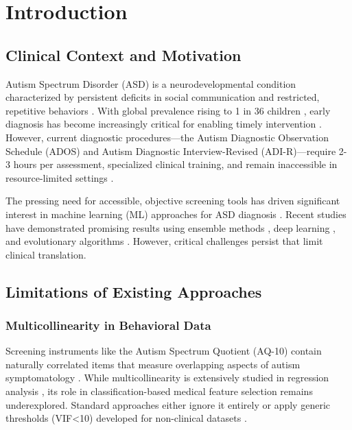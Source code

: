\documentclass[pdflatex,sn-vancouver-num]{sn-jnl}
\begin{document}
\section{Introduction}\label{introduction}

\subsection{Clinical Context and Motivation}\label{clinical-context-and-motivation}

Autism Spectrum Disorder (ASD) is a neurodevelopmental condition characterized by persistent deficits in social communication and restricted, repetitive behaviors \cite{ref1}. With global prevalence rising to 1 in 36 children \cite{ref2}, early diagnosis has become increasingly critical for enabling timely intervention \cite{ref3}. However, current diagnostic procedures---the Autism Diagnostic Observation Schedule (ADOS) and Autism Diagnostic Interview-Revised (ADI-R)---require 2-3 hours per assessment, specialized clinical training, and remain inaccessible in resource-limited settings \cite{ref4}.

The pressing need for accessible, objective screening tools has driven significant interest in machine learning (ML) approaches for ASD diagnosis \cite{ref5,ref6,ref7,ref8,ref9}. Recent studies have demonstrated promising results using ensemble methods \cite{ref10}, deep learning \cite{ref11}, and evolutionary algorithms \cite{ref12}. However, critical challenges persist that limit clinical translation.

\subsection{Limitations of Existing Approaches}\label{limitations-of-existing-approaches-1}

\subsubsection{Multicollinearity in Behavioral Data}

Screening instruments like the Autism Spectrum Quotient (AQ-10) contain naturally correlated items that measure overlapping aspects of autism symptomatology \cite{ref13}. While multicollinearity is extensively studied in regression analysis \cite{ref14}, its role in classification-based medical feature selection remains underexplored. Standard approaches either ignore it entirely or apply generic thresholds (VIF\textless10) developed for non-clinical datasets \cite{ref15}.
\end{document}
